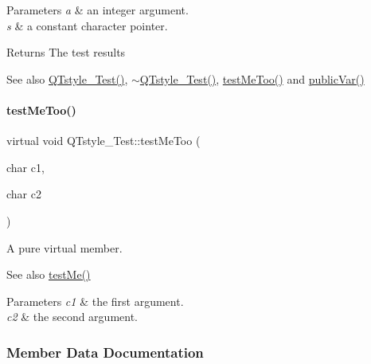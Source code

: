 \begin{DoxyParams}{Parameters}
{\em a} & an integer argument. \\
\hline
{\em s} & a constant character pointer. \\
\hline
\end{DoxyParams}
\begin{DoxyReturn}{Returns}
The test results 
\end{DoxyReturn}
\begin{DoxySeeAlso}{See also}
\mbox{\hyperlink{class_q_tstyle___test_a14a296ea4e2ad446712f2310bec60766}{Q\+Tstyle\+\_\+\+Test()}}, \mbox{\hyperlink{class_q_tstyle___test_a7e82397d534d9a867f0857da01a46e9e}{$\sim$\+Q\+Tstyle\+\_\+\+Test()}}, \mbox{\hyperlink{class_q_tstyle___test_ad5b201f097a720d44bf976c2f27efbda}{test\+Me\+Too()}} and \mbox{\hyperlink{class_q_tstyle___test_aabf7b2e9ed83ea44aca4d213baae06d3}{public\+Var()}} 
\end{DoxySeeAlso}
\mbox{\label{class_q_tstyle___test_ad5b201f097a720d44bf976c2f27efbda}} 
\paragraph{\texorpdfstring{testMeToo()}{testMeToo()}}
{\footnotesize\ttfamily virtual void Q\+Tstyle\+\_\+\+Test\+::test\+Me\+Too (\begin{DoxyParamCaption}\item[{char}]{c1,  }\item[{char}]{c2 }\end{DoxyParamCaption})\hspace{0.3cm}{\ttfamily [pure virtual]}}



A pure virtual member. 

\begin{DoxySeeAlso}{See also}
\mbox{\hyperlink{class_q_tstyle___test_a8840748753118dd468e8368a28e49c62}{test\+Me()}} 
\end{DoxySeeAlso}

\begin{DoxyParams}{Parameters}
{\em c1} & the first argument. \\
\hline
{\em c2} & the second argument. \\
\hline
\end{DoxyParams}


\subsubsection{Member Data Documentation}
\mbox{\label{class_q_tstyle___test_a973a4566c9a036f4eca508ba5fe80dcb}} 
